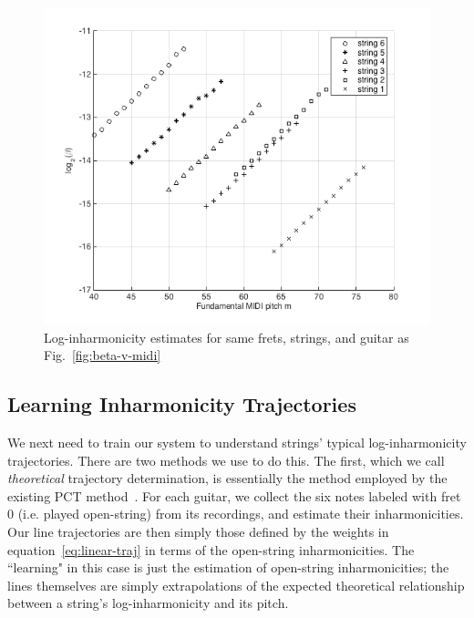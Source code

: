 \documentclass[12pt]{cmuthesis}
\begin{document}
\begin{figure}[!htbp] 
\centering
\includegraphics[scale=0.7]{log-beta-v-midi}
\caption{Log-inharmonicity estimates for same frets, strings, and guitar as Fig.~\ref{fig:beta-v-midi}}
\label{fig:log-beta-v-midi}
\end{figure}

\subsection{Learning Inharmonicity Trajectories}
We next need to train our system to understand strings' typical log-inharmonicity trajectories. There are two methods we use to do this. The first, which we call \textit{theoretical} trajectory determination, is essentially the method employed by the existing PCT method~\cite{barbanchoi2012}. For each guitar, we collect the six notes labeled with fret 0 (i.e. played open-string) from its recordings, and estimate their inharmonicities. Our line trajectories are then simply those defined by the weights in equation~\eqref{eq:linear-traj} in terms of the open-string inharmonicities. The ``learning" in this case is just the estimation of open-string inharmonicities; the lines themselves are simply extrapolations of the expected theoretical relationship between a string's log-inharmonicity and its pitch.

\end{document}
